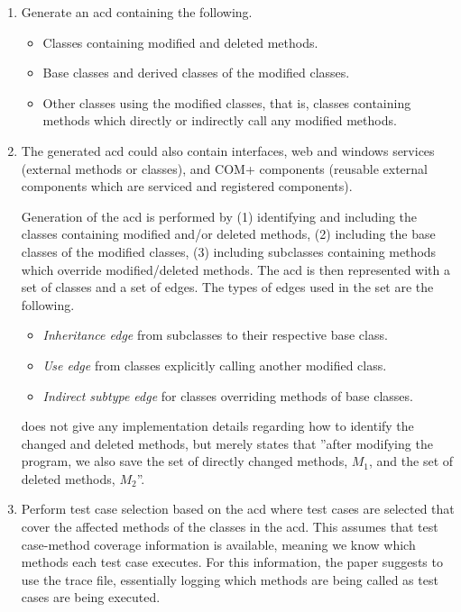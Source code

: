 \documentclass[a4paper,english,12pt]{report}
\begin{document}
\begin{enumerate}
  \item Generate an \gls{acd} containing the following.
    \begin{itemize}
      \item Classes containing modified and deleted methods.
      \item Base classes and derived classes of the modified classes.
      \item Other classes using the modified classes, that is, classes containing methods which directly or indirectly call any modified methods.
    \end{itemize}
  \item[] The generated \gls{acd} could also contain interfaces, web and windows services (external methods or classes), and COM+ components (reusable external components which are serviced and registered components). 
  
  Generation of the \gls{acd} is performed by (1) identifying and including the classes containing modified and/or deleted methods, (2) including the base classes of the modified classes, (3) including subclasses containing methods which override modified/deleted methods. The \gls{acd} is then represented with a set of classes and a set of edges. The types of edges used in the set are the following.
  
    \begin{itemize}
      \item\textit{Inheritance edge} from subclasses to their respective base class.
      \item\textit{Use edge} from classes explicitly calling another modified class.
      \item\textit{Indirect subtype edge} for classes overriding methods of base classes. 	
    \end{itemize}
    
  \citet{mansour2009regression} does not give any implementation details regarding how to identify the changed and deleted methods, but merely states that ''after modifying the program, we also save the set of directly changed methods, $M_1$, and the set of deleted methods, $M_2$''.

  \item Perform test case selection based on the \gls{acd} where test cases are selected that cover the affected methods of the classes in the \gls{acd}. This assumes that test case-method coverage information is available, meaning we know which methods each test case executes. For this information, the paper suggests to use the trace file, essentially logging which methods are being called as test cases are being executed.
\end{enumerate}
\end{document}
